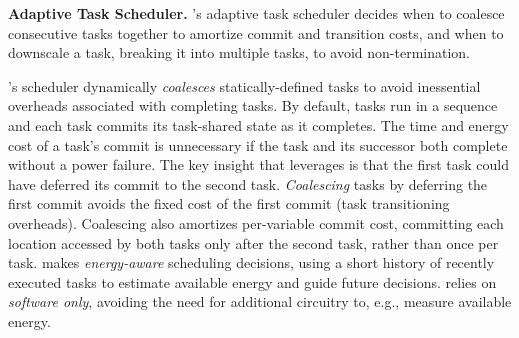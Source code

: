 \textbf{Adaptive Task Scheduler.} 
\sys's adaptive task scheduler decides when to coalesce consecutive tasks
together to amortize commit and transition costs, and when to downscale a task,
breaking it into multiple tasks, to avoid non-termination.

\sys's scheduler dynamically {\em coalesces} statically\hyp{}defined tasks to
avoid inessential overheads associated with completing tasks. By default, tasks
run in a sequence and each task commits its task-shared state as it completes.
The time and energy cost of a task's commit is unnecessary if the task and its
successor both complete without a power failure. The key insight that \sys
leverages is that the first task could have deferred its commit to the second
task. {\em Coalescing} tasks by deferring the first commit avoids the fixed
cost of the first commit (task transitioning overheads). Coalescing also
amortizes per-variable commit cost, committing each location accessed by both
tasks only after the second task, rather than once per task.  \sys makes
\emph{energy-aware} scheduling decisions, using a short history of recently
executed tasks to estimate available energy and guide future decisions. \sys
relies on {\em software only}, avoiding the need for additional circuitry to,
e.g., measure available energy.


